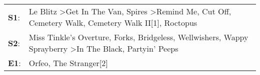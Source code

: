 \begin{supertabular}{p{0.03\textwidth}p{0.92\textwidth}}
 \textbf{S1}:  &  Le Blitz\textsuperscript{} \textgreater \enspace Get In The Van\textsuperscript{}, \enspace Spires\textsuperscript{} \textgreater \enspace Remind Me\textsuperscript{}, \enspace Cut Off\textsuperscript{}, \enspace Cemetery Walk\textsuperscript{}, \enspace Cemetery Walk II[1]\textsuperscript{}, \enspace Roctopus\textsuperscript{}  \enspace  \\
 \textbf{S2}:  &                                     Miss Tinkle's Overture\textsuperscript{}, \enspace Forks\textsuperscript{}, \enspace Bridgeless\textsuperscript{}, \enspace Wellwishers\textsuperscript{}, \enspace Wappy Sprayberry\textsuperscript{} \textgreater \enspace In The Black\textsuperscript{}, \enspace Partyin' Peeps\textsuperscript{}  \enspace  \\
 \textbf{E1}:  &                                                                                                                                                                                                                                                                        Orfeo\textsuperscript{}, \enspace The Stranger[2]\textsuperscript{}  \enspace  \\
\end{supertabular}
